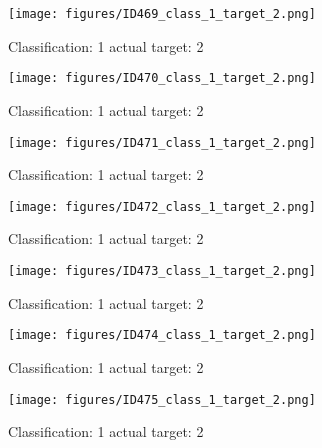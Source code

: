 \begin{figure}[h!]
\begin{center}
\texttt{[image: figures/ID469\_class\_1\_target\_2.png]}
\end{center}
\caption{ Classification: 1 actual target: 2}
\label{fig:ID469_class_1_target_2}
\end{figure}
\begin{figure}[h!]
\begin{center}
\texttt{[image: figures/ID470\_class\_1\_target\_2.png]}
\end{center}
\caption{ Classification: 1 actual target: 2}
\label{fig:ID470_class_1_target_2}
\end{figure}
\begin{figure}[h!]
\begin{center}
\texttt{[image: figures/ID471\_class\_1\_target\_2.png]}
\end{center}
\caption{ Classification: 1 actual target: 2}
\label{fig:ID471_class_1_target_2}
\end{figure}
\begin{figure}[h!]
\begin{center}
\texttt{[image: figures/ID472\_class\_1\_target\_2.png]}
\end{center}
\caption{ Classification: 1 actual target: 2}
\label{fig:ID472_class_1_target_2}
\end{figure}
\begin{figure}[h!]
\begin{center}
\texttt{[image: figures/ID473\_class\_1\_target\_2.png]}
\end{center}
\caption{ Classification: 1 actual target: 2}
\label{fig:ID473_class_1_target_2}
\end{figure}
\begin{figure}[h!]
\begin{center}
\texttt{[image: figures/ID474\_class\_1\_target\_2.png]}
\end{center}
\caption{ Classification: 1 actual target: 2}
\label{fig:ID474_class_1_target_2}
\end{figure}
\begin{figure}[h!]
\begin{center}
\texttt{[image: figures/ID475\_class\_1\_target\_2.png]}
\end{center}
\caption{ Classification: 1 actual target: 2}
\label{fig:ID475_class_1_target_2}
\end{figure}
